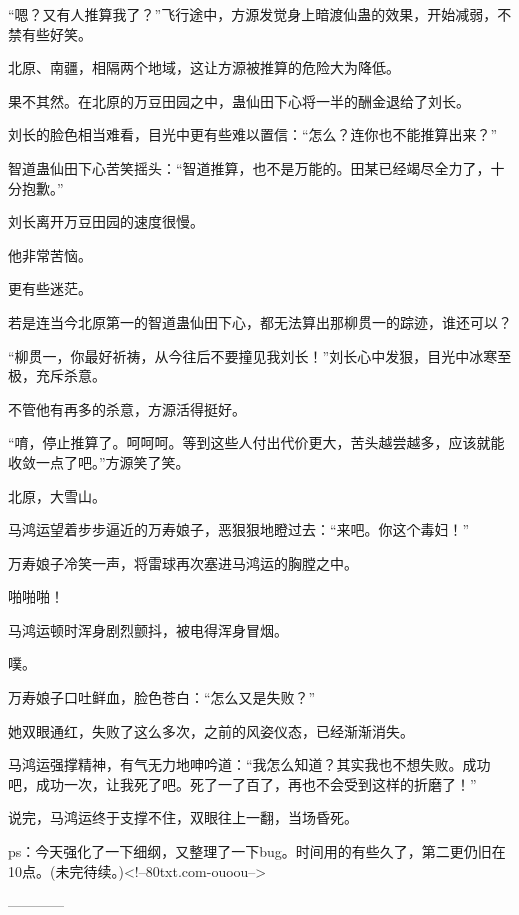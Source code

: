 \begin{this_body}
“嗯？又有人推算我了？”飞行途中，方源发觉身上暗渡仙蛊的效果，开始减弱，不禁有些好笑。

北原、南疆，相隔两个地域，这让方源被推算的危险大为降低。

果不其然。在北原的万豆田园之中，蛊仙田下心将一半的酬金退给了刘长。

刘长的脸色相当难看，目光中更有些难以置信：“怎么？连你也不能推算出来？”

智道蛊仙田下心苦笑摇头：“智道推算，也不是万能的。田某已经竭尽全力了，十分抱歉。”

刘长离开万豆田园的速度很慢。

他非常苦恼。

更有些迷茫。

若是连当今北原第一的智道蛊仙田下心，都无法算出那柳贯一的踪迹，谁还可以？

“柳贯一，你最好祈祷，从今往后不要撞见我刘长！”刘长心中发狠，目光中冰寒至极，充斥杀意。

不管他有再多的杀意，方源活得挺好。

“唷，停止推算了。呵呵呵。等到这些人付出代价更大，苦头越尝越多，应该就能收敛一点了吧。”方源笑了笑。

北原，大雪山。

马鸿运望着步步逼近的万寿娘子，恶狠狠地瞪过去：“来吧。你这个毒妇！”

万寿娘子冷笑一声，将雷球再次塞进马鸿运的胸膛之中。

啪啪啪！

马鸿运顿时浑身剧烈颤抖，被电得浑身冒烟。

噗。

万寿娘子口吐鲜血，脸色苍白：“怎么又是失败？”

她双眼通红，失败了这么多次，之前的风姿仪态，已经渐渐消失。

马鸿运强撑精神，有气无力地呻吟道：“我怎么知道？其实我也不想失败。成功吧，成功一次，让我死了吧。死了一了百了，再也不会受到这样的折磨了！”

说完，马鸿运终于支撑不住，双眼往上一翻，当场昏死。

ps：今天强化了一下细纲，又整理了一下bug。时间用的有些久了，第二更仍旧在10点。(未完待续。)<!--80txt.com-ouoou-->

------------

\end{this_body}

